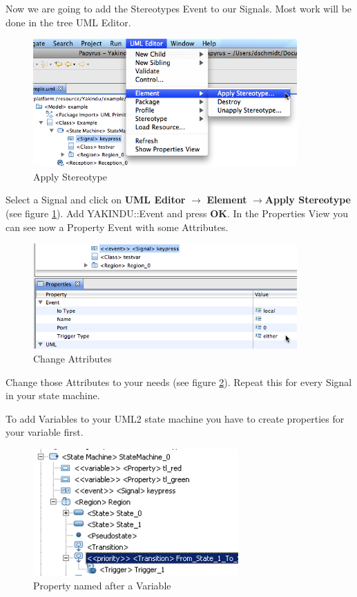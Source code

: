 Now we are going to add the Stereotypes Event to our Signals. Most work will be done in the tree UML Editor. 
\begin{figure}[h] \center
\includegraphics[width=0.9\textwidth]{Pictures/editorApplyStereotype}
\caption{\label{fig:editorApplyStereotype}Apply Stereotype} 
\end{figure}

Select a Signal and click on \textbf{UML Editor} $\rightarrow$ \textbf{Element}
$\rightarrow$\textbf{Apply Stereotype} (see figure
\ref{fig:editorApplyStereotype}). Add YAKINDU::Event and press \textbf{OK}. In
the Properties View you can see now a Property Event with some Attributes.
\begin{figure}[h] 
\center
\includegraphics[width=0.9\textwidth]{Pictures/editorProperty}
\caption{\label{fig:editorProperty}Change Attributes} 
\end{figure}
Change those Attributes to your needs (see figure \ref{fig:editorProperty}).
Repeat this for every Signal in your state machine.

To add Variables to your UML2 state machine you have to create properties for your variable first. 
\begin{figure}[h] 
\center
\includegraphics[width=0.7\textwidth]{Pictures/variableExpression}
\caption{\label{fig:variableExpression}Property named after a Variable} 
\end{figure}

